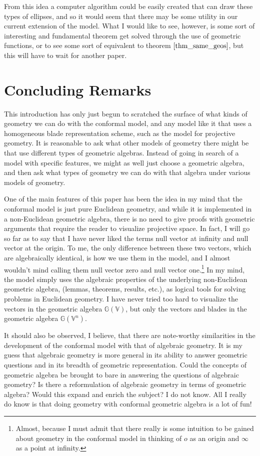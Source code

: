 \documentclass[12pt]{article}
\newcommand{\G}{\mathbb{G}}
\newcommand{\V}{\mathbb{V}}
\newcommand{\nvao}{o}
\newcommand{\nvai}{\infty}
\begin{document}
From this idea a computer algorithm could be easily created that can
draw these types of ellipses, and so it would seem that there may
be some utility in our current extension of the model.  What I would like to see,
however, is some sort of interesting and fundamental theorem get solved
through the use of geometric functions, or to see some sort of
equivalent to theorem $\eqref{thm_same_geos}$, but this will have
to wait for another paper.

\section{Concluding Remarks}

This introduction has only just begun to scratched the surface of
what kinds of geometry we can do with the conformal model, and
any model like it that uses a homogeneous blade representation scheme,
such as the model for projective geometry.  It is reasonable to ask
what other models of geometry there might be that use different
types of geometric algebras.  Instead of going in search of a model
with specific features, we might as well just choose a geometric algebra,
and then ask what types of geometry we can do with that algebra under
various models of geometry.

One of the main features of this paper has been the idea in my mind
that the conformal model is just pure Euclidean geometry, and while
it is implemented in a non-Euclidean geometric algebra, there is no
need to give proofs with geometric arguments that require the reader
to visualize projective space.  In fact, I will go so far as to say that
I have never liked the terms null vector at infinity and null vector at
the origin.  To me, the only difference between these two vectors, which are algebraically identical,
is how we use them in the model, and I almost wouldn't mind calling them null vector zero
and null vector one.\footnote{Almost, because I must admit that there really is some intuition to
be gained about geometry in the conformal model in thinking of $\nvao$ as an origin and $\nvai$ as a point at infinity.}
In my mind, the model simply uses the algebraic properties
of the underlying non-Euclidean geometric algebra, (lemmas, theorems, results, etc.), as logical tools for
solving problems in Euclidean geometry.  I have never tried too hard to visualize the vectors in the geometric
algebra $\G(\V)$, but only the vectors and blades in the geometric algebra $\G(\V^n)$.

It should also be observed, I believe, that there are note-worthy similarities in the
development of the conformal model with that of algebraic geometry.
It is my guess that algebraic geometry is more general in its
ability to answer geometric questions and in its breadth of geometric representation.
Could the concepts of geometric algebra be brought to bare in answering the questions of algebraic
geometry?  Is there a reformulation of algebraic geometry in terms of geometric algebra?
Would this expand and enrich the subject?  I do not know.  All I really do know is
that doing geometry with conformal geometric algebra is a lot of fun!

\pagebreak


\end{document}
